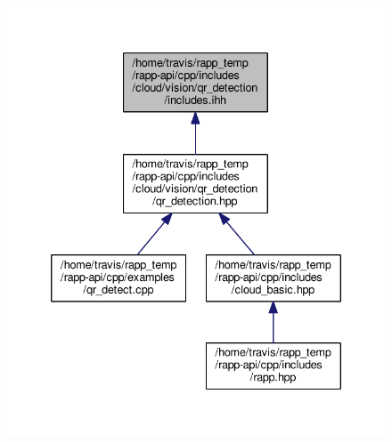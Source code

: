 \begin{figure}[H]
\begin{center}
\leavevmode
\includegraphics[width=335pt]{cloud_2vision_2qr__detection_2includes_8ihh__dep__incl}
\end{center}
\end{figure}
